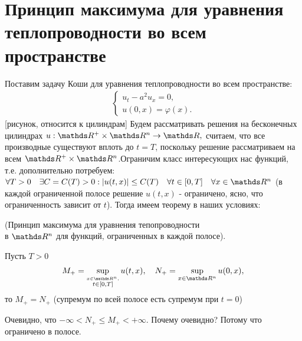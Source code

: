 
\section{Принцип максимума для уравнения теплопроводности во всем пространстве}
Поставим задачу Коши для уравнения теплопроводности во всем пространстве:
\begin{align}
    \begin{cases} 
        u_t - a^2 u_x = 0, \\
        u (0, x) = \varphi (x).
    \end{cases}
\label{transcalency}
\end{align}
[рисунок, относится к цилиндрам]
Будем рассматривать решения на бесконечных цилиндрах $u : \real^+ \times \real^n \rightarrow \real,$ считаем, что все производные существуют вплоть до $t = T$, поскольку решение рассматриваем на всем $\real^+ \times \real^n $.Ограничим класс интересующих нас функций, т.е. дополнительно потребуем: $ \forall T > 0 \quad \exists C = C(T) > 0 : |u(t, x)| \leq C(T) \quad \forall t \in [0, T] \quad \forall x \in \real^n$ (в каждой ограниченной полосе решение $u(t, x)$ - ограничено, ясно, что ограниченность зависит от $t$). Тогда имеем теорему в наших условиях:

\begin{theorem}{(Принцип максимума для уравнения тепопроводности \\ в $\real^n$ для функций, ограниченных в каждой полосе).}

Пусть $T > 0$ $$ M_+ = \sup_{\stackrel{x \in \real^n,} {t \in [0, T]}}u(t,x), \quad N_+ = \sup_{x \in \real^n} u(0, x), $$ то $M_+ = N_+$ (супремум по всей полосе есть супремум при $t = 0$)

\begin{note}Очевидно, что $-\infty < N_+ \leq M_+ < +\infty.$ Почему очевидно? Потому что ограничено в полосе.\end{note}
\end{theorem}

